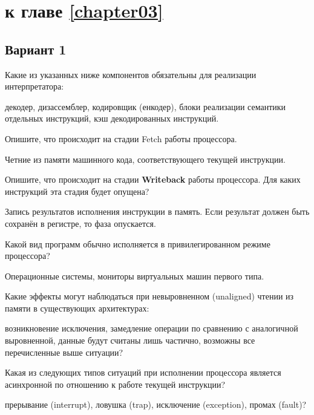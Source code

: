 \section{\Questions к главе \ref{chapter03}} %

\subsection*{Вариант 1}

\begin{questions}
\question[1] Какие из указанных ниже компонентов обязательны для реализации интерпретатора:
\begin{choices}
    \correctchoice декодер,
    \choice дизассемблер,
    \choice кодировщик (енкодер),
    \correctchoice блоки реализации семантики отдельных инструкций,
    \choice кэш декодированных инструкций.
\end{choices}

\question[3] Опишите, что происходит на стадии Fetch работы процессора.
\begin{solution}[1cm]
Четние из памяти машинного кода, соответствующего текущей инструкции.
\end{solution}

\question[3] Опишите, что происходит на стадии \textbf{Writeback} работы процессора. Для каких инструкций эта стадия будет опущена?
\begin{solution}[2cm]
Запись результатов исполнения инструкции в память. Если результат должен быть сохранён в регистре, то фаза опускается.
\end{solution}

\question[3] Какой вид программ обычно исполняется в привилегированном режиме процессора?
\begin{solution}[1cm]
Операционные системы, мониторы виртуальных машин первого типа.
\end{solution}

\question[1] Какие эффекты могут наблюдаться при невыровненном (unaligned) чтении из памяти в существующих архитектурах:
\begin{choices}
    \correctchoice возникновение исключения,
    \correctchoice     замедление операции по сравнению с аналогичной выровненной,
    \choice данные будут считаны лишь частично,
    \choice  возможны все перечисленные выше ситуации?
\end{choices}

\question[3] Какая из следующих типов ситуаций при исполнении процессора является асинхронной по отношению к работе текущей инструкции?
\begin{choices}
    \correctchoice прерывание (interrupt),
    \choice ловушка (trap),
    \choice исключение (exception),
    \choice промах (fault)?
\end{choices}


\end{questions}
